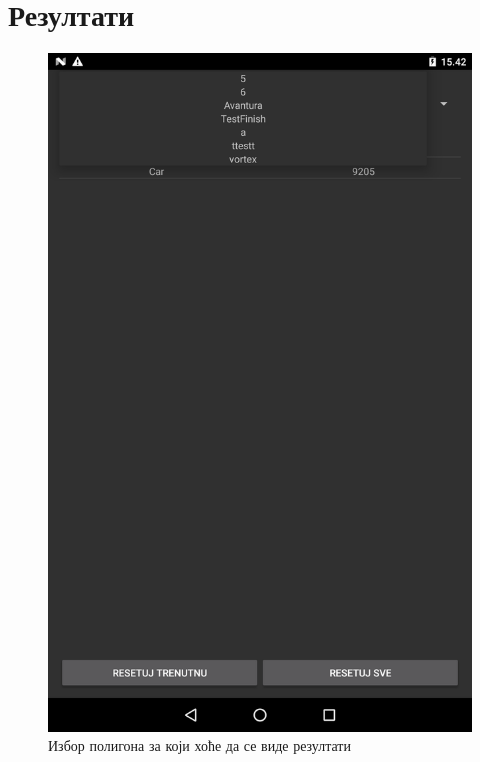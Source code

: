 \section{Резултати}\label{UseCases:Statistics}
\begin{figure}[htb!]
\begin{center}
\includegraphics[scale=.1]{pictures/statistics/Choose}
\caption{Избор полигона за који хоће да се виде резултати}\label{fig:statisticChoose}
\end{center}
\end{figure}

